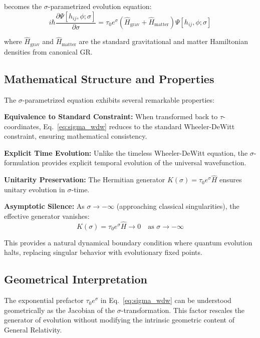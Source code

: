 \documentclass[12pt,a4paper]{article}
\begin{document}
becomes the $\sigma$-parametrized evolution equation:
\begin{equation}
\boxed{i\hbar \frac{\partial \Psi[h_{ij}, \phi; \sigma]}{\partial \sigma} = \tau_0 e^{\sigma} \left(\hat{H}_{\text{grav}} + \hat{H}_{\text{matter}}\right) \Psi[h_{ij}, \phi; \sigma]}
\label{eq:sigma_wdw}
\end{equation}

where $\hat{H}_{\text{grav}}$ and $\hat{H}_{\text{matter}}$ are the standard gravitational and matter Hamiltonian densities from canonical GR.

\subsection{Mathematical Structure and Properties}

The $\sigma$-parametrized equation exhibits several remarkable properties:

\textbf{Equivalence to Standard Constraint:} When transformed back to $\tau$-coordinates, Eq.~\eqref{eq:sigma_wdw} reduces to the standard Wheeler-DeWitt constraint, ensuring mathematical consistency.

\textbf{Explicit Time Evolution:} Unlike the timeless Wheeler-DeWitt equation, the $\sigma$-formulation provides explicit temporal evolution of the universal wavefunction.

\textbf{Unitarity Preservation:} The Hermitian generator $K(\sigma) = \tau_0 e^{\sigma} \hat{H}$ ensures unitary evolution in $\sigma$-time.

\textbf{Asymptotic Silence:} As $\sigma \to -\infty$ (approaching classical singularities), the effective generator vanishes:
\begin{equation}
K(\sigma) = \tau_0 e^{\sigma} \hat{H} \to 0 \quad \text{as } \sigma \to -\infty
\label{eq:asymptotic_silence}
\end{equation}

This provides a natural dynamical boundary condition where quantum evolution halts, replacing singular behavior with evolutionary fixed points.

\subsection{Geometrical Interpretation}

The exponential prefactor $\tau_0 e^{\sigma}$ in Eq.~\eqref{eq:sigma_wdw} can be understood geometrically as the Jacobian of the $\sigma$-transformation. This factor rescales the generator of evolution without modifying the intrinsic geometric content of General Relativity.
\end{document}
